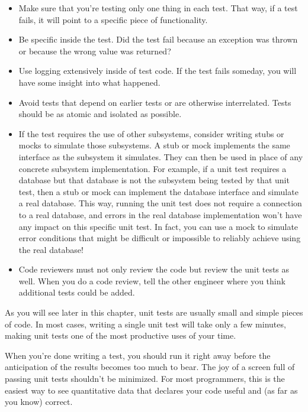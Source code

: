 \begin{itemize}
\item
Make sure that you’re testing only one thing in each test. That way, if a test fails, it will point to a specific piece of functionality.

\item
Be specific inside the test. Did the test fail because an exception was thrown or because the wrong value was returned?

\item
Use logging extensively inside of test code. If the test fails someday, you will have some insight into what happened.

\item
Avoid tests that depend on earlier tests or are otherwise interrelated. Tests should be as atomic and isolated as possible.

\item
If the test requires the use of other subsystems, consider writing stubs or mocks to simulate those subsystems. A stub or mock implements the same interface as the subsystem it simulates. They can then be used in place of any concrete subsystem implementation. For example, if a unit test requires a database but that database is not the subsystem being tested by that unit test, then a stub or mock can implement the database interface and simulate a real database. This way, running the unit test does not require a connection to a real database, and errors in the real database implementation won’t have any impact on this specific unit test. In fact, you can use a mock to simulate error conditions that might be difficult or impossible to reliably achieve using the real database!

\item
Code reviewers must not only review the code but review the unit tests as well. When you do a code review, tell the other engineer where you think additional tests could be added.
\end{itemize}

As you will see later in this chapter, unit tests are usually small and simple pieces of code. In most cases, writing a single unit test will take only a few minutes, making unit tests one of the most productive uses of your time.


When you’re done writing a test, you should run it right away before the anticipation of the results becomes too much to bear. The joy of a screen full of passing unit tests shouldn’t be minimized. For most programmers, this is the easiest way to see quantitative data that declares your code useful and (as far as you know) correct.

